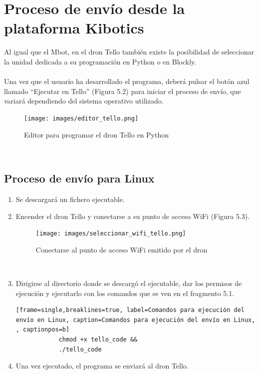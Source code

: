 \documentclass{report}
\begin{document}
\section{Proceso de envío desde la plataforma Kibotics}

Al igual que el Mbot, en el dron Tello también existe la posibilidad de seleccionar la unidad dedicada a su programación en Python o en Blockly.
\\
\\
Una vez que el usuario ha desarrollado el programa, deberá pulsar el botón azul llamado “Ejecutar en Tello” (Figura 5.2) para iniciar el proceso de envío, que variará dependiendo del sistema operativo utilizado.
\\
\begin{figure}[h!]
  \centering
    \texttt{[image: images/editor\_tello.png]}
  \caption{Editor para programar el dron Tello en Python}
  \label{Editor para programar el dron Tello en Python}
\end{figure}
\\

\subsection{Proceso de envío para Linux}

\begin{enumerate}
	\item Se descargará un fichero ejecutable.
	\item Encender el dron Tello y conectarse a su punto de acceso WiFi (Figura 5.3).
	\\
		\begin{figure}[h!]
 			 \centering
    			\texttt{[image: images/seleccionar\_wifi\_tello.png]}
  			\caption{Conectarse al punto de acceso WiFi emitido por el dron}
  			\label{Conectarse al punto de acceso WiFi emitido por el dron}
		\end{figure}
	\\
	\item Dirigirse al directorio donde se descargó el ejecutable, dar los permisos de ejecución y ejecutarlo con los comandos que se ven en el fragmento 5.1.
	\\
		\begin{lstlisting}[frame=single,breaklines=true, label=Comandos para ejecución del envío en Linux, caption=Comandos para ejecución del envío en Linux, , captionpos=b]
			chmod +x tello_code &&
			./tello_code

		\end{lstlisting}
	\item Una vez ejecutado, el programa se enviará al dron Tello.

\end{enumerate}
	
\end{document}
